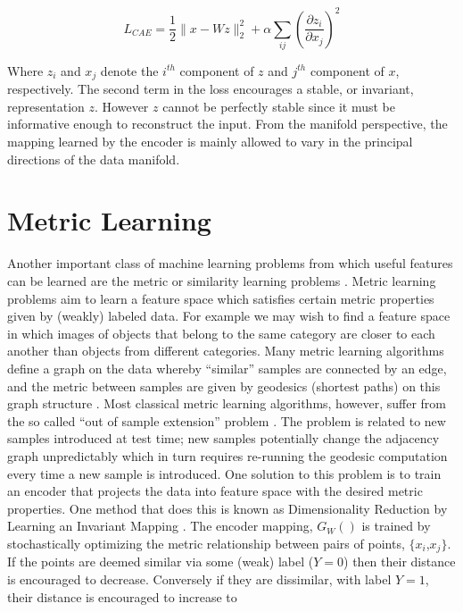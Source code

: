 \begin{equation} 
\nonumber 
L_{CAE} = \frac{1}{2} \|x - Wz \|_2 ^ 2 + \alpha \sum_{ij} \left(\frac{\partial z_i}{\partial x_j}\right)^2  
\end{equation}  

Where $z_i$ and $x_j$ denote the $i^{th}$ component of $z$ and $j^{th}$
component of $x$, respectively.  The second term in the loss encourages a
stable, or invariant, representation $z$. However $z$ cannot be perfectly
stable since it must be informative enough to reconstruct the input. From the
manifold perspective, the mapping learned by the encoder is mainly allowed to
vary in the principal directions of the data manifold.           

\section{Metric Learning}
Another important class of machine learning problems from which useful features
can be learned are the metric or similarity learning problems
\cite{tenenbaum2000,DrLIM}. Metric learning problems aim to learn a feature
space which satisfies certain metric properties given by (weakly) labeled data.
For example we may wish to find a feature space in which images of objects that
belong to the same category are closer to each another than objects from
different categories. Many metric learning algorithms define a graph on the
data whereby ``similar'' samples are connected by an edge, and the metric
between samples are given by geodesics (shortest paths) on this graph structure
\cite{tenenbaum2000, coifman2006}. Most classical metric learning algorithms,
however, suffer from the so called ``out of sample extension'' problem
\cite{bengio2004out,coifman2006geometric}. The problem is related to new samples 
introduced at test time; new samples potentially change the adjacency graph 
unpredictably which in turn requires re-running the geodesic computation every
time a new sample is introduced. One solution to this problem is to train an
encoder that projects the data into feature space with the desired metric
properties. One method that does this is known as Dimensionality Reduction by
Learning an Invariant Mapping \cite{DrLIM}. The encoder mapping, $G_W()$ is
trained by stochastically optimizing the metric relationship between pairs of
points, $\{x_i$,$x_j\}$.  If the points are deemed similar via some (weak)
label ($Y=0$) then their distance is encouraged to decrease. Conversely if they
are dissimilar, with label $Y=1$, their distance is encouraged to increase to
